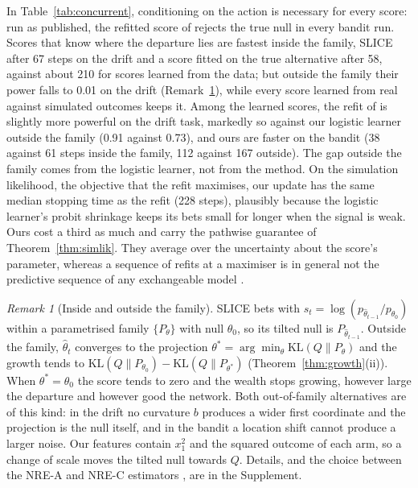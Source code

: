 \documentclass[11pt]{article}
\newcommand{\KL}{\mathrm{KL}}
\theoremstyle{remark}
\newtheorem{remark}{Remark}
\begin{document}
In Table~\ref{tab:concurrent}, conditioning on the action is necessary for
every score: run as published, the refitted score of
\citet{forre2026anytime} rejects the true null in every bandit run. Scores
that know where the departure lies are fastest inside the family, SLICE after
67 steps on the drift and a score fitted on the true alternative after 58,
against about 210 for scores learned from the data; but outside the family
their power falls to 0.01 on the drift (Remark~\ref{rem:family}), while every
score learned from real against simulated outcomes keeps it. Among the learned
scores, the refit of \citet{forre2026anytime} is slightly more powerful on the
drift task, markedly so against our logistic learner outside the family (0.91
against 0.73), and ours are faster on the bandit (38 against 61 steps inside
the family, 112 against 167 outside). The gap outside the family comes from
the logistic learner, not from the method. On the simulation likelihood, the
objective that the refit maximises, our update has the same median stopping
time as the refit (228 steps), plausibly because the logistic learner's probit
shrinkage keeps its bets small for longer when the signal is weak. Ours cost a
third as much and carry the pathwise guarantee of Theorem~\ref{thm:simlik}.
They average over the uncertainty about the score's parameter, whereas a sequence of refits at a maximiser is in general not the
predictive sequence of any exchangeable model
\citep{fortini2000exchangeability,fortini2024exchangeability}.

\begin{remark}[Inside and outside the family]\label{rem:family}
SLICE bets with $s_t = \log (p_{\hat\theta_{t-1}}/p_{\theta_0})$ within a
parametrised family $\{P_\theta\}$ with null $\theta_0$, so its tilted null is
$P_{\hat\theta_{t-1}}$. Outside the family, $\hat\theta_t$ converges to the
projection $\theta^* = \arg\min_\theta \KL(Q\|P_\theta)$ and the growth tends to
$\KL(Q\|P_{\theta_0}) - \KL(Q\|P_{\theta^*})$ (Theorem~\ref{thm:growth}(ii)).
When $\theta^* = \theta_0$ the score tends to zero and the wealth stops
growing, however large the departure and however good the network. Both
out-of-family alternatives are of this kind: in the drift no curvature $b$
produces a wider first coordinate and the projection is the null itself, and
in the bandit a location shift cannot produce a larger noise. Our features
contain $x_1^2$ and the squared outcome of each arm, so a change of scale moves
the tilted null towards $Q$. Details, and the choice between the NRE-A and
NRE-C estimators \citep{miller2022contrastive}, are in the Supplement.
\end{remark}
\end{document}
